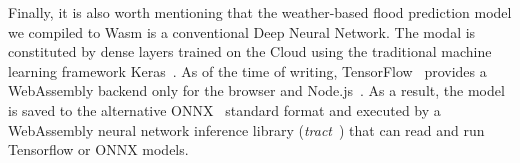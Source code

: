 
Finally, it is also worth mentioning that the weather-based flood prediction model we compiled to Wasm is a conventional Deep Neural Network. The modal is constituted by dense layers trained on the Cloud using the traditional machine learning framework Keras~\cite{keras}. As of the time of writing, TensorFlow~\cite{tensorflow} provides a WebAssembly backend only for the browser and Node.js~\cite{tf-wasm}. As a result, the model is saved to the alternative ONNX~\cite{onnx} standard format and executed by a WebAssembly neural network inference library (\emph{tract}~\cite{tract}) that can read and run Tensorflow or ONNX models. \\





